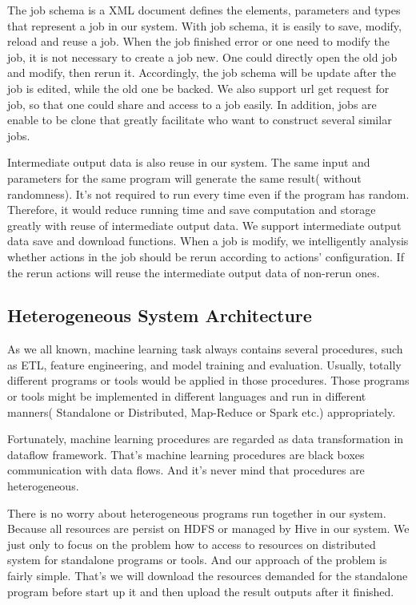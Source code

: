 \documentclass{sig-alternate-05-2015}
\begin{document}
The job schema is a XML document defines the elements, parameters and types that represent a job in our system. With job schema, it is easily to save, modify, reload and reuse a job. When the job finished error or one need to modify the job, it is not necessary to create a job new. One could directly open the old job and modify, then rerun it. Accordingly, the job schema will be update after the job is edited, while the old one be backed. We also support url get request for job, so that one could share and access to a job easily. In addition, jobs are enable to be clone that greatly facilitate who want to construct several similar jobs.

Intermediate output data is also reuse in our system. The same input and parameters for the same program will generate the same result( without randomness). It's not required to run every time even if the program has random. Therefore, it would reduce running time and save computation and storage greatly with reuse of intermediate output data. We support intermediate output data save and download functions. When a job is modify, we intelligently analysis whether actions in the job should be rerun according to actions' configuration. If the rerun actions will reuse the intermediate output data of non-rerun ones.


\subsection{Heterogeneous System Architecture}

As we all known, machine learning task always contains several procedures, such as ETL, feature engineering, and model training and evaluation. Usually, totally different programs or tools would be applied in those procedures. Those programs or tools might be implemented in different languages and run in different manners( Standalone or Distributed, Map-Reduce or Spark etc.) appropriately. 

Fortunately, machine learning procedures are regarded as data transformation in dataflow framework. That's machine learning procedures are black boxes communication with data flows. And it's never mind that procedures are heterogeneous.

There is no worry about heterogeneous programs run together in our system. Because all resources are persist on HDFS or managed by Hive in our system. We just only to focus on the problem how to access to resources on distributed system for standalone programs or tools. And our approach of the problem is fairly simple. That's we will download the resources demanded for the standalone program before start up it and then upload the result outputs after it finished.
\end{document}
